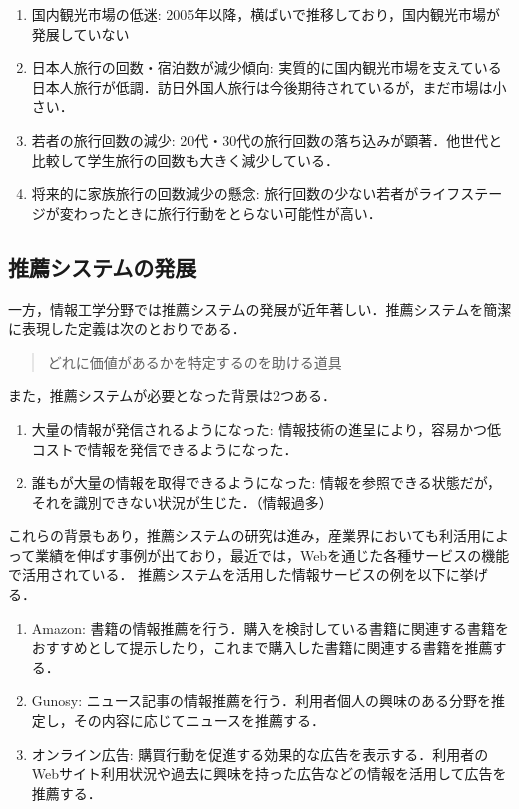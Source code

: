 \documentclass{jsarticle}
\begin{document}
\begin{enumerate}
\item 国内観光市場の低迷: 2005年以降，横ばいで推移しており，国内観光市場が発展していない
\item 日本人旅行の回数・宿泊数が減少傾向: 実質的に国内観光市場を支えている日本人旅行が低調．訪日外国人旅行は今後期待されているが，まだ市場は小さい．
\item 若者の旅行回数の減少: 20代・30代の旅行回数の落ち込みが顕著．他世代と比較して学生旅行の回数も大きく減少している．
\item 将来的に家族旅行の回数減少の懸念: 旅行回数の少ない若者がライフステージが変わったときに旅行行動をとらない可能性が高い．
\end{enumerate}

\subsection{推薦システムの発展}
\label{evolution_recommendation_system}

一方，情報工学分野では推薦システムの発展が近年著しい．推薦システムを簡潔に表現した定義は次のとおりである\cite{define_of_recommendation_system}．

\begin{quote}
どれに価値があるかを特定するのを助ける道具
\end{quote}

また，推薦システムが必要となった背景は2つある\cite{kamishima_recommendation}．

\begin{enumerate}
\item 大量の情報が発信されるようになった: 情報技術の進呈により，容易かつ低コストで情報を発信できるようになった．
\item 誰もが大量の情報を取得できるようになった: 情報を参照できる状態だが，それを識別できない状況が生じた．（情報過多\cite{information_overload}）
\end{enumerate}

これらの背景もあり，推薦システムの研究は進み，産業界においても利活用によって業績を伸ばす事例が出ており，最近では，Webを通じた各種サービスの機能で活用されている．
推薦システムを活用した情報サービスの例を以下に挙げる．

\begin{enumerate}
\item Amazon: 書籍の情報推薦を行う．購入を検討している書籍に関連する書籍をおすすめとして提示したり，これまで購入した書籍に関連する書籍を推薦する．
\item Gunosy: ニュース記事の情報推薦を行う．利用者個人の興味のある分野を推定し，その内容に応じてニュースを推薦する．
\item オンライン広告: 購買行動を促進する効果的な広告を表示する．利用者のWebサイト利用状況や過去に興味を持った広告などの情報を活用して広告を推薦する．
\end{enumerate}
\end{document}

